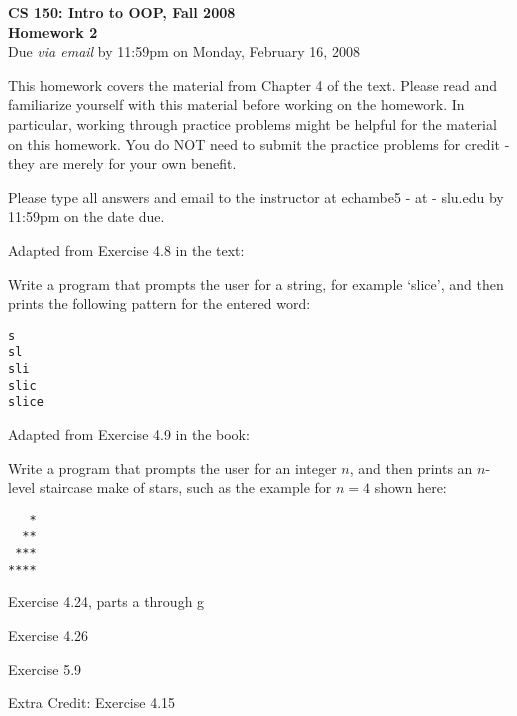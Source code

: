 \documentclass[11pt]{article}
\begin{document}

\begin{center}
\LARGE \textbf{CS 150: Intro to OOP, Fall 2008}
\\
\textbf{Homework 2}
\\[1ex]
\Large Due \emph{via email} by 11:59pm on Monday, February 16, 2008\\

\end{center}

This homework covers the material from Chapter 4 of the text. Please
read and familiarize yourself with this material before working on
the homework.  In particular, working through practice problems
might be helpful for the material on this homework. You do NOT need
to submit the practice problems for credit - they are merely for
your own benefit.

Please type all answers and email to the instructor at echambe5 - at -
slu.edu by 11:59pm on the date due.

\begin{problems}
\item Adapted from Exercise 4.8 in the text:

Write a program that prompts the user for a string, for example
`slice', and then prints the following pattern for the entered word:

\begin{verbatim}
s
sl
sli
slic
slice
\end{verbatim}

\item Adapted from Exercise 4.9 in the book:

Write a program that prompts the user for an integer $n$, and then
prints an $n$-level staircase make of stars, such as the example for
$n=4$ shown here:

\begin{verbatim}
   *
  **
 ***
****
\end{verbatim}

\item Exercise 4.24, parts a through g

\item Exercise 4.26

\item Exercise 5.9

\item Extra Credit: Exercise 4.15

\end{problems}
\end{document}
